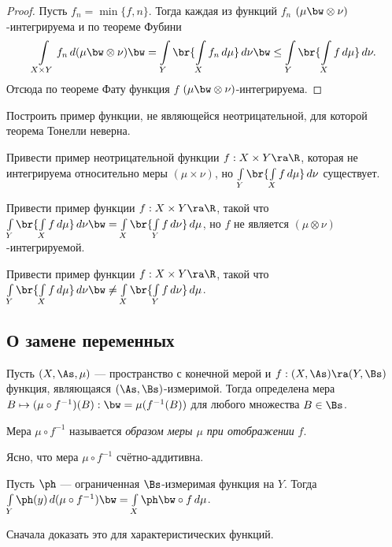 \documentclass[10pt]{article}
\begin{document}
\begin{proof}
Пусть $f_n=\min\{f,n\}$. Тогда каждая из функций $f_n$ $(\mu\bw
\otimes\nu)$-интегрируема и по теореме Фубини
$$\int\limits_{X\times
Y}f_n\,d(\mu\bw \otimes\nu)\bw =\int\limits_Y
\br{\int\limits_Xf_n\,d\mu}\,d\nu\bw \le\int\limits_Y
\br{\int\limits_Xf\,d\mu}\,d\nu.$$
Отсюда по теореме Фату функция $f$
$(\mu\bw \otimes\nu)$-интегрируема.
\end{proof}

\begin{problem}
Построить пример функции, не являющейся неотрицательной, для которой
теорема Тонелли неверна.
\end{problem}

\begin{problem}
Привести пример неотрицательной функции $f: X\times Y\ra \R$,
которая не интегрируема относительно меры $(\mu\times\nu)$, но
$\int\limits_Y \br{\int\limits_Xf\,d\mu}\,d\nu$ существует.
\end{problem}

\begin{problem}
Привести пример функции $f: X\times Y\ra \R$, такой что
$\int\limits_Y \br{\int\limits_Xf\,d\mu}\,d\nu\bw =\int\limits_X
\br{\int\limits_Yf\,d\nu}\,d\mu$, но $f$ не является
$(\mu\otimes\nu)$-интегрируемой.
\end{problem}

\begin{problem}
Привести пример функции $f: X\times Y\ra \R$, такой что
$\int\limits_Y \br{\int\limits_Xf\,d\mu}\,d\nu\bw \ne\int\limits_X
\br{\int\limits_Yf\,d\nu}\,d\mu$.
\end{problem}

\subsection{О замене переменных}

Пусть $(X,\As,\mu)$ --- пространство с конечной мерой и $f:
(X,\As)\ra (Y,\Bs)$ функция, являющаяся $(\As,\Bs)$-измеримой. Тогда
определена мера $B\mapsto (\mu\circ f^{-1})(B):\bw =\mu(f^{-1}(B))$
для любого множества $B\in\Bs$.

\begin{df}
Мера $\mu\circ f^{-1}$ называется \emph{образом меры $\mu$ при
отображении} $f$.
\end{df}

Ясно, что мера $\mu\circ f^{-1}$ счётно-аддитивна.

\begin{problem}
Пусть $\ph$ --- ограниченная $\Bs$-измеримая функция на $Y$. Тогда
$\int\limits_Y\ph(y)\,d(\mu\circ f^{-1})\bw =\int\limits_X\ph
\bw\circ f\,d\mu$.
\end{problem}
\begin{hint}
Сначала доказать это для характеристических функций.
\end{hint}
\end{document}
